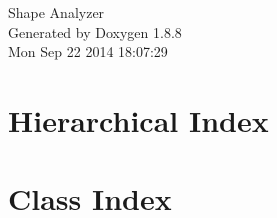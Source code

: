 \documentclass[twoside]{book}
\newcommand{\+}{\discretionary{\mbox{\scriptsize$\hookleftarrow$}}{}{}}
\newcommand{\clearemptydoublepage}{%
  \newpage{\pagestyle{empty}\cleardoublepage}%
}
\begin{document}
\hypersetup{pageanchor=false,
             bookmarks=true,
             bookmarksnumbered=true,
             pdfencoding=unicode
            }
\begin{titlepage}
\vspace*{7cm}
\begin{center}%
{\Large Shape Analyzer }\\
\vspace*{1cm}
{\large Generated by Doxygen 1.8.8}\\
\vspace*{0.5cm}
{\small Mon Sep 22 2014 18:07:29}\\
\end{center}
\end{titlepage}
\clearemptydoublepage
\tableofcontents
\clearemptydoublepage
{}
\hypersetup{pageanchor=true}

\chapter{Hierarchical Index}

\chapter{Class Index}

\end{document}

